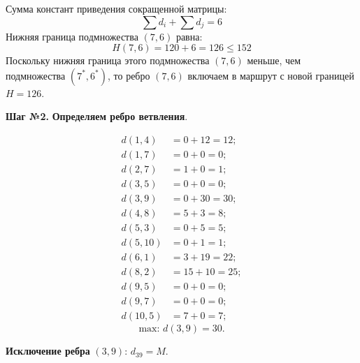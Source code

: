 \documentclass[17pt]{extarticle}
\begin{document}
Сумма констант приведения сокращенной матрицы:
\[ \sum d_i + \sum d_j = 6 \]
Нижняя граница подмножества \((7,6)\) равна:
\[ H(7,6) = 120 + 6 = 126 \leq 152 \]
Поскольку нижняя граница этого подмножества \((7,6)\) меньше, чем подмножества \((7^*,6^*)\), то ребро \((7,6)\) включаем в маршрут с новой границей \( H = 126 \).

\textbf{Шаг №2.}
\textbf{Определяем ребро ветвления}.

\[
    \begin{aligned}
        d(1,4)  & = 0 + 12 = 12;  \\
        d(1,7)  & = 0 + 0 = 0;    \\
        d(2,7)  & = 1 + 0 = 1;    \\
        d(3,5)  & = 0 + 0 = 0;    \\
        d(3,9)  & = 0 + 30 = 30;  \\
        d(4,8)  & = 5 + 3 = 8;    \\
        d(5,3)  & = 0 + 5 = 5;    \\
        d(5,10) & = 0 + 1 = 1;    \\
        d(6,1)  & = 3 + 19 = 22;  \\
        d(8,2)  & = 15 + 10 = 25; \\
        d(9,5)  & = 0 + 0 = 0;    \\
        d(9,7)  & = 0 + 0 = 0;    \\
        d(10,5) & = 7 + 0 = 7;
    \end{aligned}
\]
\[ \text{max: } d(3,9) = 30. \]

\textbf{Исключение ребра} \((3,9)\): \( d_{39} = M \).
\end{document}
